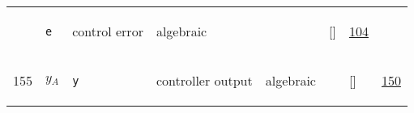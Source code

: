 \begin{longtable}{|p{1cm}|p{3cm}|p{3cm}|p{7cm}|p{3.0cm}|p{3cm}|p{2cm}|p{1cm}|}
             & \verb|e|
             & control error
             & \begin{lay}algebraic \end{lay}
             & $  $
             & []
             & \hyperlink{"e:104"}{ 104 }
                 \\
    155
             & \hypertarget{"v:155"}{ $ {y}{_{A}} $}
             & \verb|y|
             & controller output
             & \begin{lay}algebraic \end{lay}
             & $  $
             & []
             & \hyperlink{"e:150"}{ 150 }
                 \\
    \end{longtable}